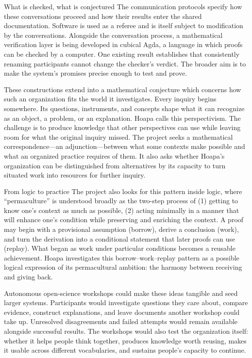 \begin{frame}[t]{What is checked, what is conjectured}
  \small
   The communication protocols specify how these conversations proceed and how their results enter the shared documentation. Software is used as a referee and is itself subject to modification by the conversations. Alongside the conversation process, a mathematical verification layer is being developed in cubical Agda, a language in which proofs can be checked by a computer. One existing result establishes that consistently renaming participants cannot change the checker's verdict. The broader aim is to make the system's promises precise enough to test and prove.
  \par\medskip
   These constructions extend into a mathematical conjecture which concerns how such an organization fits the world it investigates. Every inquiry begins somewhere. Its questions, instruments, and concepts shape what it can recognize as an object, a problem, or an explanation. Hoapa calls this perspectivism. The challenge is to produce knowledge that other perspectives can use while leaving room for what the original inquiry missed. The project seeks a mathematical correspondence—an adjunction—between what some contexts make possible and what an organized practice requires of them. It also asks whether Hoapa's organization can be distinguished from alternatives by its capacity to turn situated work into resources for further inquiry.
\end{frame}

\begin{frame}[t]{From logic to practice}
  \small
   The project also looks for this pattern inside logic, where ``permaculture'' is understood broadly as the two-step process of (1) getting to know one's context as much as possible, (2) acting minimally in a manner that will enhance one's condition while preserving and enriching the context. A proof may begin with a provisional assumption (borrow), derive a conclusion (work), and turn the derivation into a conditional statement that later proofs can use (replay). What began as work under particular conditions becomes a reusable achievement. Hoapa investigates this borrow–work–replay pattern as a possible logical expression of its permacultural ambition: the harmony between receiving and giving back.
  \par\medskip
   Autonomous open-science workshops could make these ideas tangible and seed larger systems. Participants would investigate questions they care about, compare evidence, construct explanations, and leave documents another workshop could take up. Unresolved disagreements and failed attempts would remain available alongside successful results. The workshops would also test the organization itself: whether it helps people think together, produces knowledge worth reusing, makes it usable across different vocabularies, and sustains people's capacity to continue.
\end{frame}


